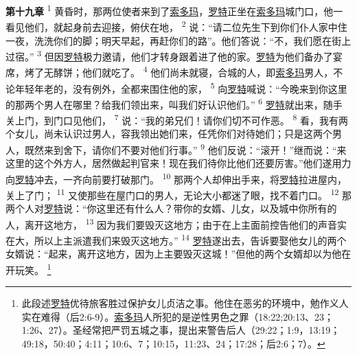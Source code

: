 \textbf{第十九章\quad}
\textsuperscript{1}
黄昏时，那两位使者来到了\uline{索多玛}，\uline{罗特}正坐在\uline{索多玛}城门口，他一看见他们，就起身前去迎接，俯伏在地，
\textsuperscript{2}
说：“请二位先生下到你们仆人家中住一夜，洗洗你们的脚；明天早起，再赶你们的路”。他们答说：“不，我们愿在街上过宿。”
\textsuperscript{3}
但因\uline{罗特}极力邀请，他们才转身跟着进了他的家。\uline{罗特}为他们备办了宴席，烤了无酵饼；他们就吃了。
\textsuperscript{4}
他们尚未就寝，合城的人，即\uline{索多玛}男人，不论年轻年老的，没有例外，全都来围住他的家，
\textsuperscript{5}
向\uline{罗特}喊说：“今晚来到你这里的那两个男人在哪里？给我们领出来，叫我们好认识他们。”
\textsuperscript{6}
\uline{罗特}就出来，随手关上门，到门口见他们，
\textsuperscript{7}
说：“我的弟兄们！请你们切不可作恶。
\textsuperscript{8}
看，我有两个女儿，尚未认识过男人，容我领出她们来，任凭你们对待她们；只是这两个男人，既然来到舍下，请你们不要对他们行事。”
\textsuperscript{9}
他们反说：“滚开！”继而说：“来这里的这个外方人，居然做起判官来！现在我们待你比他们还要厉害。”他们遂用力向\uline{罗特}冲去，一齐向前要打破那门。
\textsuperscript{10}
那两个人却伸出手来，将\uline{罗特}拉进屋内，关上了门；
\textsuperscript{11}
又使那些在屋门口的男人，无论大小都迷了眼，找不着门口。
\textsuperscript{12}
那两个人对\uline{罗特}说：“你这里还有什么人？带你的女婿、儿女，以及城中你所有的人，离开这地方，
\textsuperscript{13}
因为我们要毁灭这地方；由于在上主面前控告他们的声音实在大，所以上主派遣我们来毁灭这地方。”
\textsuperscript{14}
\uline{罗特}遂出去，告诉要娶他女儿的两个女婿说：“起来，离开这地方，因为上主要毁灭这城！”但他的两个女婿却以为他在开玩笑。
\footnote{此段述\uline{罗特}优待旅客胜过保护女儿贞洁之事。他住在恶劣的环境中，勉作义人实在难得（后2:6-9）。\uline{索多玛}人所犯的是逆性男色之罪（18:22;20:13、23；1:26、27）。圣经常把严罚五城之事，提出来警告后人（29:22；1:9，13:19；49:18，50:40；4:11；10:6、7；10:15，11:23、24；17:28；后2:6；7）。}

